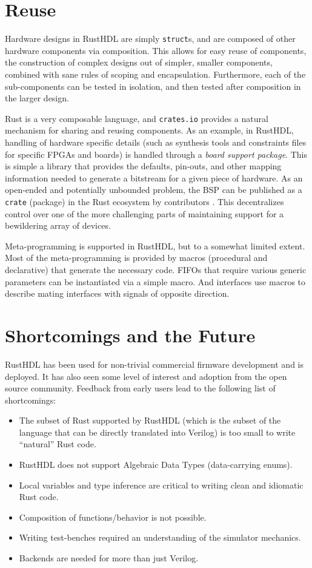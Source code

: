 \documentclass[sigplan,screen,sigconf]{acmart}
\begin{document}
\section{Reuse}
Hardware designs in RustHDL are simply \verb|struct|s, and are composed of other 
hardware components via composition.  This allows for easy reuse of components, the
construction of complex designs out of simpler, smaller components, combined with sane rules of scoping and encapsulation.  Furthermore, each of the sub-components can be tested in isolation, and then tested after composition in the larger design. 

Rust is a very composable language, and \verb|crates.io| provides a natural mechanism
for sharing and reusing components.  As an example, in RustHDL, handling of hardware specific details (such as synthesis tools and constraints files for specific FPGAs and boards) is handled through a \emph{board support package}.  This is simple a library that provides the defaults, pin-outs, and other mapping information needed to generate a bitstream for a given piece of hardware.  As an open-ended and potentially unbounded problem, the BSP can be published as a \verb|crate| (package) in the Rust ecosystem by contributors \cite{b7}.  This decentralizes control over one of the more challenging parts of maintaining support for a bewildering array of devices. 

Meta-programming is supported in RustHDL, but to a somewhat limited extent.  Most of the meta-programming is provided by macros (procedural and declarative) that generate the necessary code.   FIFOs that require various generic parameters can be instantiated via a simple macro.  And interfaces use macros to describe mating interfaces with signals of opposite direction.  

\section{Shortcomings and the Future}
RustHDL has been used for non-trivial commercial firmware development and is deployed.  It has also seen some level of interest and adoption from the open source community.  Feedback from early users lead to the following list of shortcomings:

\begin{itemize}
  \item The subset of Rust supported by RustHDL (which is the subset of the language that can be   directly translated into Verilog) is too small to write ``natural'' Rust code. 
  \item RustHDL does not support Algebraic Data Types (data-carrying enums).
  \item Local variables and type inference are critical to writing clean and
  idiomatic Rust code.  
  \item Composition of functions/behavior is not possible. 
  \item Writing test-benches required an understanding of the simulator mechanics.
  \item Backends are needed for more than just Verilog.
\end{itemize}
\end{document}
